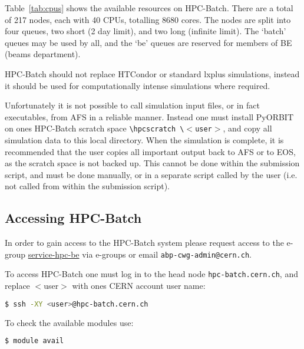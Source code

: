 \documentclass[a4paper]{cernatsnote}
\def \headnode {\texttt{hpc-batch.cern.ch}}
\begin{document}
	Table~\ref{tab:cpus} shows the available resources on HPC-Batch. There are a total of 217 nodes, each with 40 CPUs, totalling 8680 cores. The nodes are split into four queues, two short (2 day limit), and two long (infinite limit). The `batch' queues may be used by all, and the `be' queues are reserved for members of BE (beams department).
	
	HPC-Batch should not replace HTCondor or standard lxplus simulations, instead it should be used for computationally intense simulations where required.
	
	Unfortunately it is not possible to call simulation input files, or in fact executables, from AFS in a reliable manner. Instead one must install PyORBIT on ones HPC-Batch scratch space \texttt{\textbackslash hpcscratch \textbackslash $<$user$>$}, and copy all simulation data to this local directory. When the simulation is complete, it is recommended that the user copies all important output back to AFS or to EOS, as the scratch space is not backed up. This cannot be done within the submission script, and must be done manually, or in a separate script called by the user (i.e. not called from within the submission script).
		
	\subsection{Accessing HPC-Batch}
	\label{sec:access}
	
	In order to gain access to the HPC-Batch system please request access to the e-group \href{https://e-groups.cern.ch/e-groups/Egroup.do?egroupId=10245625&AI_USERNAME=HARAFIQU&searchField=0&searchMethod=0&searchValue=service-hpc-be&pageSize=30&hideSearchFields=false&searchMemberOnly=false&searchAdminOnly=false&AI_SESSION=lKFyHz8s-iVcgi9UtzwK-aBtk4OSxot37tlEfn8KCeHPzfMElLZd!393472965!1522333073243}{service-hpc-be} via e-groups or email \texttt{abp-cwg-admin@cern.ch}.
	
	To access HPC-Batch one must log in to the head node \headnode, and replace $<$user$>$ with ones CERN account user name:
	
	\begin{lstlisting}[language=bash]
	$ ssh -XY <user>@hpc-batch.cern.ch
	\end{lstlisting}
	
	To check the available modules use:
	\begin{lstlisting}[language=bash]
	$ module avail
	\end{lstlisting}
	
\end{document}
